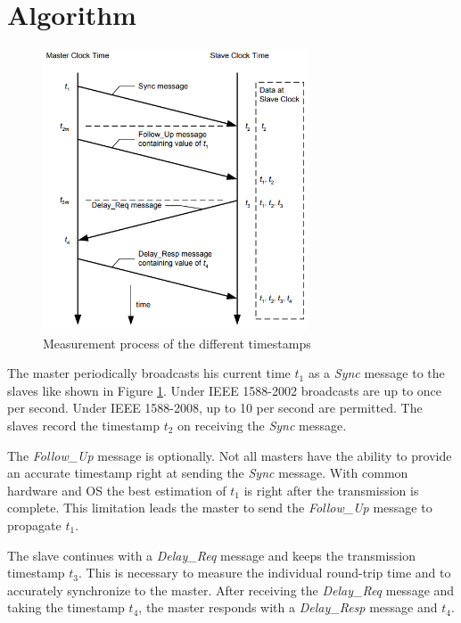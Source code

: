 \section{Algorithm}

\begin{figure}[tb]
	\centering
	\includegraphics[width=0.7\textwidth]{figures/ptp_algorithm.png}
	\caption{Measurement process of the different timestamps}
	\label{fig:ptp_algorithm}
\end{figure}

The master periodically broadcasts his current time $t_1$ as a \textit{Sync} message to the slaves like shown in Figure \ref{fig:ptp_algorithm}. Under IEEE 1588-2002 broadcasts are up to once per second. Under IEEE 1588-2008, up to 10 per second are permitted. The slaves record the timestamp $t_2$ on receiving the \textit{Sync} message.

The \textit{Follow\_Up} message is optionally. Not all masters have the ability to provide an accurate timestamp right at sending the \textit{Sync} message. With common hardware and OS the best estimation of $t_1$ is right after the transmission is complete. This limitation leads the master to send the \textit{Follow\_Up} message to propagate $t_1$.

The slave continues with a \textit{Delay\_Req} message and keeps the transmission timestamp $t_3$. This is necessary to measure the individual round-trip time and to accurately synchronize to the master. After receiving the \textit{Delay\_Req} message and taking the timestamp $t_4$, the master responds with a \textit{Delay\_Resp} message and $t_4$.

